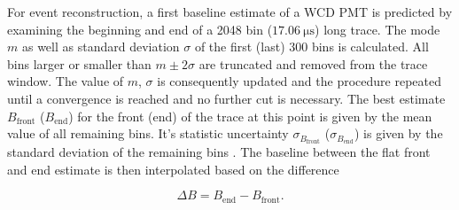 For event reconstruction, a first baseline estimate of a WCD PMT is predicted by examining the beginning and end of a 2048 bin ($\SI{17.06}{\micro\second}$) long 
trace. The mode $m$ as well as standard deviation $\sigma$ of the first (last) 300 bins is calculated. All bins larger or smaller than $m\pm2\sigma$ are truncated 
and removed from the trace window. The value of $m$, $\sigma$ is consequently updated and the procedure repeated until a convergence is reached and no further cut 
is necessary. The best estimate $B_\text{front}$ ($B_\text{end}$) for the front (end) of the trace at this point is given by the mean value of all remaining bins. 
It's statistic uncertainty $\sigma_{B_\text{front}}$ ($\sigma_{B_\text{end}}$) is given by the standard deviation of the remaining bins \cite{tobiasBaseline}. The 
baseline between the flat front and end estimate is then interpolated based on the difference 

\begin{equation}
	\Delta B = B_\text{end} - B_\text{front}.
\end{equation}

